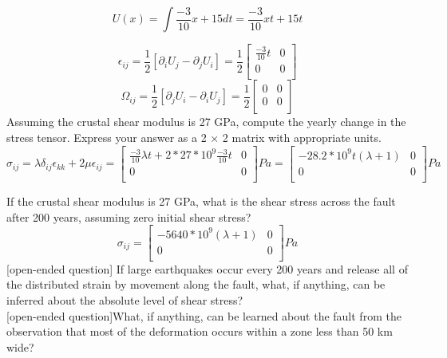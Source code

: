 \documentclass{article}
\begin{document}
\[
U\left(x\right) = \int{ \frac{-3}{10}x + 15 dt } = \frac{-3}{10}xt + 15t
\]

\[
\epsilon_{ij} = \frac{1}{2}  \left[ \partial_{i} U_{j} - \partial_{j} U_{i} \right] = 
\frac{1}{2}  
  \left[ {\begin{array}{cc}
    \frac{-3}{10}t & 0 \\
    0 & 0 \\
  \end{array} }
  \right]
\]
\[
\Omega_{ij} = \frac{1}{2} \left[ \partial_{j}U_{i} - \partial_{i}U_{j} \right] = \frac{1}{2}  
  \left[ {\begin{array}{cc}
    0 & 0 \\
    0 & 0 \\
  \end{array} }
  \right]
\]
Assuming the crustal shear modulus is 27 GPa, compute the yearly change in the stress tensor. Express your answer as a 2 × 2 matrix with appropriate units.
\[
\sigma_{ij} = \lambda \delta_{ij} \epsilon_{kk} + 2\mu \epsilon_{ij} =   \left[ {\begin{array}{cc}
     \frac{-3}{10} \lambda t + 2 * 27*10^{9} \frac{-3}{10}t & 0 \\
    0 & 0 \\
  \end{array} }
  \right] Pa = \left[ {\begin{array}{cc}
    -28.2 * 10^{9}t \left( \lambda  + 1\right)  & 0 \\
    0 & 0 \\
  \end{array} }
  \right] Pa
\]



If the crustal shear modulus is 27 GPa, what is the shear stress across the fault after 200 years, assuming zero initial shear stress?
\[
\sigma_{ij} = \left[ {\begin{array}{cc}
    -5640 * 10^{9} \left( \lambda  + 1\right)  & 0 \\
    0 & 0 \\
  \end{array} }
  \right] Pa
\]
[open-ended question] If large earthquakes occur every 200 years and release all of the distributed strain by movement along the fault, what, if anything, can be inferred about the absolute level of shear stress?\\

[open-ended question]What, if anything, can be learned about the fault from the observation that most of the deformation occurs within a zone less than 50 km wide? \\
\end{document}
